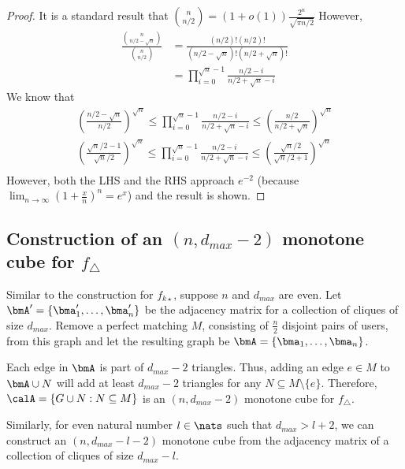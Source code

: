 \begin{proof}
It is a standard result that $\binom{n}{n/2} = (1+o(1)) \frac{2^{n}}{\sqrt{\pi n/2}}$
However,
\begin{align*}
    \frac{\binom{n}{n/2-\sqrt{n}}}{\binom{n}{n/2}} &= \frac{(n/2)!(n/2)!}{(n/2-\sqrt{n})!(n/2+\sqrt{n})!} \\
    &= \prod_{i=0}^{\sqrt{n}-1} \frac{n/2-i}{n/2+\sqrt{n}-i}
\end{align*}
We know that
\begin{align*}
    \left(\frac{n/2-\sqrt{n}}{n/2}\right)^{\sqrt{n}} \leq \prod_{i=0}^{\sqrt{n}-1} \frac{n/2-i}{n/2+\sqrt{n}-i} \leq \left(\frac{n/2}{n/2+\sqrt{n}} \right)^{\sqrt{n}} \\
    \left(\frac{\sqrt{n}/2-1}{\sqrt{n}/2}\right)^{\sqrt{n}} \leq \prod_{i=0}^{\sqrt{n}-1} \frac{n/2-i}{n/2+\sqrt{n}-i} \leq \left(\frac{\sqrt{n}/2}{\sqrt{n}/2+1} \right)^{\sqrt{n}} \\
\end{align*}
However, both the LHS and the RHS approach $e^{-2}$ (because $\lim_{n \rightarrow \infty} (1+\frac{x}{n})^n = e^x$) and the result is shown.
\end{proof}


\subsection{Construction of an $(n, d_{max}-2)$ monotone cube for $f_\triangle$}
\label{chap1-sub:cube_triangle}
Similar to the construction for $f_{k\star}$, suppose $n$ and $d_{max}$ are
even. Let $\bmA' = \{\bma_1', \ldots, \bma_n'\}$ be the adjacency matrix for a 
collection of cliques of size $d_{max}$. 
Remove a perfect matching $M$, consisting of $\frac{n}{2}$
disjoint pairs of users, from this graph and let the
resulting graph be $\bmA = \{\bma_1, \ldots, \bma_n\}$. 

Each edge in $\bmA$ is part of
$d_{max}-2$ 
triangles. 
Thus, adding an edge $e \in M$ to $\bmA \cup N$ will
add at least $d_{max}-2$ triangles for any $N \subseteq M \setminus \{e\}$. Therefore, 
$\calA = \{G \cup N : N \subseteq
M\}$ is an $(n,d_{max}-2)$ monotone cube for $f_\triangle$.

Similarly, for even natural number $l \in \nats$ such that $d_{max}>l+2$, we can construct an $(n,d_{max}-l-2)$ monotone cube from the adjacency matrix of a collection of cliques of size $d_{max}-l$.

